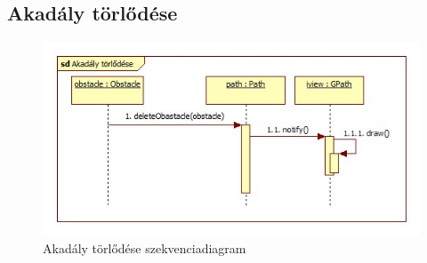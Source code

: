 \subsection{Akadály törlődése}
\begin{figure}[H]
\begin{center}
\includegraphics[width=17cm]{chapters/chapter11/images/Akadaly_torlodese.jpg}
\caption{Akadály törlődése szekvenciadiagram}
\label{fig:Akadaly_torlodese}
\end{center}
\end{figure}

